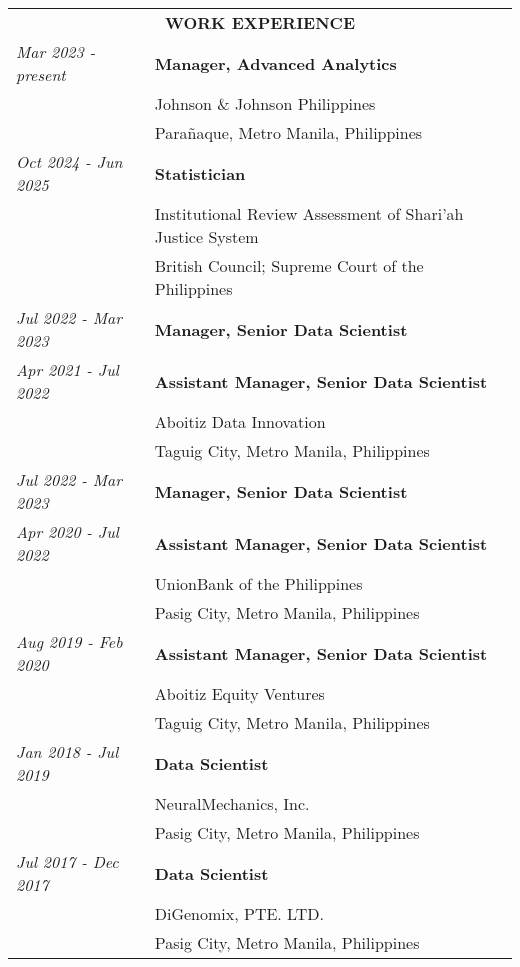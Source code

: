 \begin{tabular}{ll}
    \multicolumn{2}{c}{\bf WORK EXPERIENCE}\\[0.3cm]
    \textit{Mar 2023 - present}& \textbf{Manager, Advanced Analytics}\\
    & Johnson \& Johnson Philippines\\
    & Parañaque, Metro Manila, Philippines\\[0.5cm]
    
    \textit{Oct 2024 - Jun 2025}& \textbf{Statistician}\\
    &Institutional Review Assessment of Shari'ah Justice System\\
    &British Council; Supreme Court of the Philippines\\[0.5cm]

    \textit{Jul 2022 - Mar 2023}& \textbf{Manager, Senior Data Scientist}\\
    \textit{Apr 2021 - Jul 2022}& \textbf{Assistant Manager, Senior Data Scientist}\\
    & Aboitiz Data Innovation\\
    & Taguig City, Metro Manila, Philippines\\[0.5cm]
    
    \textit{Jul 2022 - Mar 2023}& \textbf{Manager, Senior Data Scientist}\\
    \textit{Apr 2020 - Jul 2022}& \textbf{Assistant Manager, Senior Data Scientist}\\
    & UnionBank of the Philippines\\
    & Pasig City, Metro Manila, Philippines\\[0.5cm]
    
    \textit{Aug 2019 - Feb 2020}& \textbf{Assistant Manager, Senior Data Scientist}\\
    & Aboitiz Equity Ventures\\
    & Taguig City, Metro Manila, Philippines\\[0.5cm]
    
    \textit{Jan 2018 - Jul 2019}& \textbf{Data Scientist}\\
    & NeuralMechanics, Inc.\\
    & Pasig City, Metro Manila, Philippines\\[0.5cm]
    
    \textit{Jul 2017 - Dec 2017}& \textbf{Data Scientist}\\
    & DiGenomix, PTE. LTD.\\
    & Pasig City, Metro Manila, Philippines\\[0.5cm]
\end{tabular}

